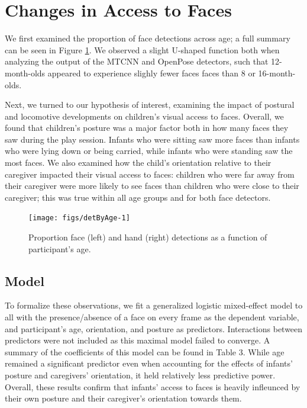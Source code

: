 \documentclass[10pt, letterpaper]{article}
\newenvironment{CodeChunk}{}{}
\begin{document}
\section{Changes in Access to Faces}\label{changes-in-access-to-faces}

We first examined the proportion of face detections across age; a full
summary can be seen in Figure \ref{fig:detByAge}. We observed a slight
U-shaped function both when analyzing the output of the MTCNN and
OpenPose detectors, such that 12-month-olds appeared to experience
slighly fewer faces faces than 8 or 16-month-olds.

Next, we turned to our hypothesis of interest, examining the impact of
postural and locomotive developments on children's visual access to
faces. Overall, we found that children's posture was a major factor both
in how many faces they saw during the play session. Infants who were
sitting saw more faces than infants who were lying down or being
carried, while infants who were standing saw the most faces. We also
examined how the child's orientation relative to their caregiver
impacted their visual access to faces: children who were far away from
their caregiver were more likely to see faces than children who were
close to their caregiver; this was true within all age groups and for
both face detectors.

\begin{CodeChunk}
\begin{figure}[h]

{\centering \texttt{[image: figs/detByAge-1]} 

}

\caption[Proportion face (left) and hand (right) detections as a function of participant's age]{Proportion face (left) and hand (right) detections as a function of participant's age.}\label{fig:detByAge}
\end{figure}
\end{CodeChunk}

\subsection{Model}\label{model}

To formalize these observations, we fit a generalized logistic
mixed-effect model to all with the presence/absence of a face on every
frame as the dependent variable, and participant's age, orientation, and
posture as predictors. Interactions between predictors were not included
as this maximal model failed to converge. A summary of the coefficients
of this model can be found in Table 3. While age remained a significant
predictor even when accounting for the effects of infants' posture and
caregivers' orientation, it held relatively less predictive power.
Overall, these results confirm that infants' access to faces is heavily
infleunced by their own posture and their caregiver's orientation
towards them.
\end{document}
